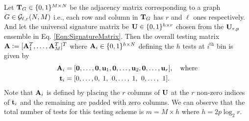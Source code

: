 \documentclass[conference,twocolumn]{IEEEtran}
\begin{document}
 Let $\mathbf{T}_{G}\in\{0,1\}^{M\times N }$ be the adjacency matrix corresponding to a graph $G\in\mathcal{G}_{\ell,r}(N,M)$ i.e., each row and column in $\mathbf{T}_{G}$ has $r$ and $\ell$ ones respectively. And let the universal signature matrix be $\mathbf{U}\in\{0,1\}^{h \times r}$ chosen from the $\mathbf{U}_{r,p}$ ensemble in Eq. \eqref{Eqn:SignatureMatrix}. Then the overall testing matrix $\mathbf{A}\mathrel{\mathop:}= [\mathbf{A}_{1}^{T},\ldots,\mathbf{A}_{M}^{T}]^T$ where $\mathbf{A}_{i}\in\{0,1\}^{h\times N}$ defining the $h$ tests at $i^{\text{th}}$ bin is given by
 \begin{align}
 \mathbf{A}_i&=[\mathbf{0},\ldots,\mathbf{0},\mathbf{u}_1, \mathbf{0},\ldots, \mathbf{u}_2,\mathbf{0}, \ldots, \mathbf{u}_{r}],\quad \text{where}\label{Eqn:TestingMatrixDefn}\\
\mathbf{t}_i &= [0,\ldots,0,\hspace{0.6ex}1,\hspace{0.9ex} 0, \ldots,\hspace{0.6ex}1,\hspace{0.9ex}0, \ldots, \hspace{0.9ex}1].\nonumber
 \end{align}
Note that $\mathbf{A}_i$ is defined by placing the $r$ columns of $\mathbf{U}$ at the $r$ non-zero indices of $\mathbf{t}_i$ and the remaining are padded with zero columns. We can observe that the total number of tests for this testing scheme is $m=M\times h$ where $h=2p\log_2 r$.
\end{document}
